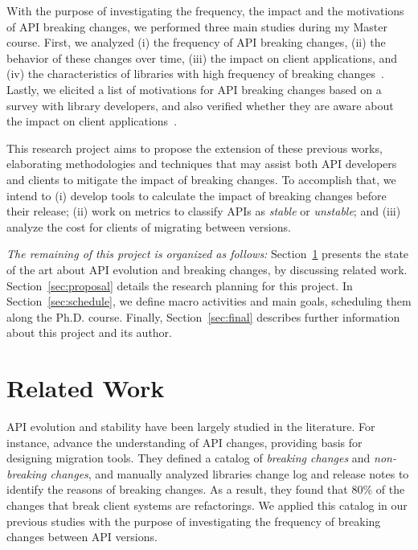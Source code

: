 \documentclass[11pt, a4paper]{article}
\begin{document}
With the purpose of investigating the frequency, the impact and the motivations of API breaking changes, we performed three main studies during my Master course.
First, we analyzed 
(i) the frequency of API breaking changes, 
(ii) the behavior of these changes over time, 
(iii) the impact on client applications, and 
(iv) the characteristics of libraries with high frequency of breaking changes~\citep{vem2017, Saner2017}.
Lastly, we elicited a list of motivations for API breaking changes based on a survey with library developers, and also verified whether they are aware about the impact on client applications~\citep{era2017}. 

This research project aims to propose the extension of these previous works, elaborating methodologies and techniques that may assist both API developers and clients to mitigate the impact of breaking changes.
To accomplish that, we intend to 
(i) develop tools to calculate the impact of breaking changes before their release; 
(ii) work on metrics to classify APIs as \emph{stable} or \emph{unstable}; and
(iii) analyze the cost for clients of migrating between versions. 

\emph{The remaining of this project is organized as follows:}
Section~\ref{sec:related} presents the state of the art about API evolution and breaking changes, by discussing related work.
Section~\ref{sec:proposal} details the research planning for this project.
In Section~\ref{sec:schedule}, we define macro activities and main goals, scheduling them along the Ph.D. course.
Finally, Section~\ref{sec:final} describes further information about this project and its author.

\section{Related Work} 
\label{sec:related}

API evolution and stability have been largely studied in the literature.
For instance, \cite{dig} advance the understanding of API changes, providing basis for designing migration tools.
They defined a catalog of \emph{breaking changes} and \emph{non-breaking changes}, and manually analyzed libraries change log and release notes to identify the reasons of breaking changes.
As a result, they found that $80$\% of the changes that break client systems are refactorings.
We applied this catalog in our previous studies with the purpose of investigating the frequency of breaking changes between API versions.
\end{document}
